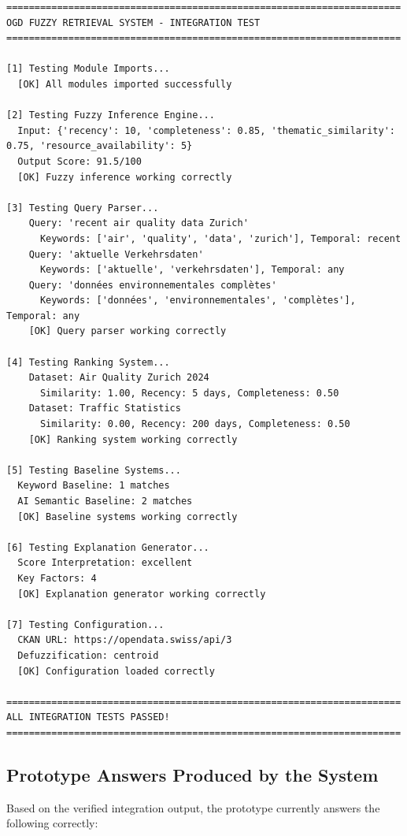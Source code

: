 \documentclass[11pt,a4paper]{article}
\begin{document}
\begin{lstlisting}
======================================================================
OGD FUZZY RETRIEVAL SYSTEM - INTEGRATION TEST
======================================================================

[1] Testing Module Imports...
  [OK] All modules imported successfully

[2] Testing Fuzzy Inference Engine...
  Input: {'recency': 10, 'completeness': 0.85, 'thematic_similarity': 0.75, 'resource_availability': 5}
  Output Score: 91.5/100
  [OK] Fuzzy inference working correctly

[3] Testing Query Parser...
    Query: 'recent air quality data Zurich'
      Keywords: ['air', 'quality', 'data', 'zurich'], Temporal: recent
    Query: 'aktuelle Verkehrsdaten'
      Keywords: ['aktuelle', 'verkehrsdaten'], Temporal: any
    Query: 'données environnementales complètes'
      Keywords: ['données', 'environnementales', 'complètes'], Temporal: any
    [OK] Query parser working correctly

[4] Testing Ranking System...
    Dataset: Air Quality Zurich 2024
      Similarity: 1.00, Recency: 5 days, Completeness: 0.50
    Dataset: Traffic Statistics
      Similarity: 0.00, Recency: 200 days, Completeness: 0.50
    [OK] Ranking system working correctly

[5] Testing Baseline Systems...
  Keyword Baseline: 1 matches
  AI Semantic Baseline: 2 matches
  [OK] Baseline systems working correctly

[6] Testing Explanation Generator...
  Score Interpretation: excellent
  Key Factors: 4
  [OK] Explanation generator working correctly

[7] Testing Configuration...
  CKAN URL: https://opendata.swiss/api/3
  Defuzzification: centroid
  [OK] Configuration loaded correctly

======================================================================
ALL INTEGRATION TESTS PASSED!
======================================================================
\end{lstlisting}

\subsection{Prototype Answers Produced by the System}

Based on the verified integration output, the prototype currently answers the following correctly:
\end{document}
